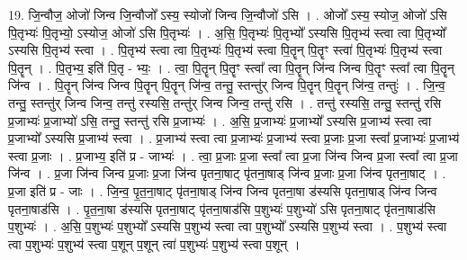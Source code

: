 \documentclass[17pt]{extarticle}
\begin{document}
19. जि॒न्वौज॒ ओजो॑ जिन्व जि॒न्वौजो᳚ ऽस्य॒ स्योजो॑ जिन्व जि॒न्वौजो॑ ऽसि । . ओजो᳚ ऽस्य॒ स्योज॒ ओजो॑ ऽसि पि॒तृभ्यः॑ पि॒तृभ्यो॒ ऽस्योज॒ ओजो॑ ऽसि पि॒तृभ्यः॑ । . अ॒सि॒ पि॒तृभ्यः॑ पि॒तृभ्यो᳚ ऽस्यसि पि॒तृभ्य॑ स्त्वा त्वा पि॒तृभ्यो᳚ ऽस्यसि पि॒तृभ्य॑ स्त्वा । . पि॒तृभ्य॑ स्त्वा त्वा पि॒तृभ्यः॑ पि॒तृभ्य॑ स्त्वा पि॒तॄन् पि॒तॄꣳ स्त्वा॑ पि॒तृभ्यः॑ पि॒तृभ्य॑ स्त्वा पि॒तॄन् । . पि॒तृभ्य॒ इति॑ पि॒तृ - भ्यः॒ । . त्वा॒ पि॒तॄन् पि॒तॄꣳ स्त्वा᳚ त्वा पि॒तॄन् जि॑न्व जिन्व पि॒तॄꣳ स्त्वा᳚ त्वा पि॒तॄन् जि॑न्व । . पि॒तॄन् जि॑न्व जिन्व पि॒तॄन् पि॒तॄन् जि॑न्व॒ तन्तु॒ स्तन्तु॑र् जिन्व पि॒तॄन् पि॒तॄन् जि॑न्व॒ तन्तुः॑ । . जि॒न्व॒ तन्तु॒ स्तन्तु॑र् जिन्व जिन्व॒ तन्तु॑ रस्यसि॒ तन्तु॑र् जिन्व जिन्व॒ तन्तु॑ रसि । . तन्तु॑ रस्यसि॒ तन्तु॒ स्तन्तु॑ रसि प्र॒जाभ्यः॑ प्र॒जाभ्यो॑ ऽसि॒ तन्तु॒ स्तन्तु॑ रसि प्र॒जाभ्यः॑ । . अ॒सि॒ प्र॒जाभ्यः॑ प्र॒जाभ्यो᳚ ऽस्यसि प्र॒जाभ्य॑ स्त्वा त्वा प्र॒जाभ्यो᳚ ऽस्यसि प्र॒जाभ्य॑ स्त्वा । . प्र॒जाभ्य॑ स्त्वा त्वा प्र॒जाभ्यः॑ प्र॒जाभ्य॑ स्त्वा प्र॒जाः प्र॒जा स्त्वा᳚ प्र॒जाभ्यः॑ प्र॒जाभ्य॑ स्त्वा प्र॒जाः । . प्र॒जाभ्य॒ इति॑ प्र - जाभ्यः॑ । . त्वा॒ प्र॒जाः प्र॒जा स्त्वा᳚ त्वा प्र॒जा जि॑न्व जिन्व प्र॒जा स्त्वा᳚ त्वा प्र॒जा जि॑न्व । . प्र॒जा जि॑न्व जिन्व प्र॒जाः प्र॒जा जि॑न्व पृतना॒षाट् पृ॑तना॒षाड् जि॑न्व प्र॒जाः प्र॒जा जि॑न्व पृतना॒षाट् । . प्र॒जा इति॑ प्र - जाः । . जि॒न्व॒ पृ॒त॒ना॒षाट् पृ॑तना॒षाड् जि॑न्व जिन्व पृतना॒षा ड॑स्यसि पृतना॒षाड् जि॑न्व जिन्व पृतना॒षाड॑सि । . पृ॒त॒ना॒षा ड॑स्यसि पृतना॒षाट् पृ॑तना॒षाड॑सि प॒शुभ्यः॑ प॒शुभ्यो॑ ऽसि पृतना॒षाट् पृ॑तना॒षाड॑सि प॒शुभ्यः॑ । . अ॒सि॒ प॒शुभ्यः॑ प॒शुभ्यो᳚ ऽस्यसि प॒शुभ्य॑ स्त्वा त्वा प॒शुभ्यो᳚ ऽस्यसि प॒शुभ्य॑ स्त्वा । . प॒शुभ्य॑ स्त्वा त्वा प॒शुभ्यः॑ प॒शुभ्य॑ स्त्वा प॒शून् प॒शून् त्वा॑ प॒शुभ्यः॑ प॒शुभ्य॑ स्त्वा प॒शून् । \newline
\end{document}
